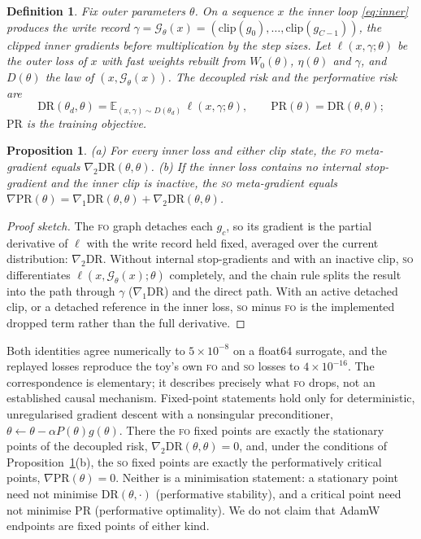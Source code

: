 \documentclass[11pt]{article}
\newtheorem{proposition}{Proposition}
\newtheorem{definition}{Definition}
\newcommand{\FO}{\textsc{fo}}
\newcommand{\SO}{\textsc{so}}
\begin{document}
\begin{definition}
Fix outer parameters $\theta$. On a sequence $x$ the inner loop \eqref{eq:inner} produces the
\emph{write record} $\gamma=\mathcal G_\theta(x)=(\mathrm{clip}(g_0),\dots,\mathrm{clip}(g_{C-1}))$,
the clipped inner gradients before multiplication by the step sizes. Let $\ell(x,\gamma;\theta)$ be
the outer loss of $x$ with fast weights rebuilt from $W_0(\theta)$, $\eta(\theta)$ and $\gamma$, and
$D(\theta)$ the law of $(x,\mathcal G_\theta(x))$. The \emph{decoupled risk} and the
\emph{performative risk} are
\begin{equation*}
  \mathrm{DR}(\theta_d,\theta)=\mathbb E_{(x,\gamma)\sim D(\theta_d)}\,\ell(x,\gamma;\theta),
  \qquad \mathrm{PR}(\theta)=\mathrm{DR}(\theta,\theta);
\end{equation*}
$\mathrm{PR}$ is the training objective.
\end{definition}

\begin{proposition}
\label{prop:decoupled}
(a) For every inner loss and either clip state, the \FO{} meta-gradient equals
$\nabla_2\mathrm{DR}(\theta,\theta)$. (b) If the inner loss contains no internal stop-gradient and the
inner clip is inactive, the \SO{} meta-gradient equals
$\nabla\mathrm{PR}(\theta)=\nabla_1\mathrm{DR}(\theta,\theta)+\nabla_2\mathrm{DR}(\theta,\theta)$.
\end{proposition}

\begin{proof}[Proof sketch]
The \FO{} graph detaches each $g_c$, so its gradient is the partial derivative of $\ell$ with the
write record held fixed, averaged over the current distribution: $\nabla_2\mathrm{DR}$. Without
internal stop-gradients and with an inactive clip, \SO{} differentiates
$\ell(x,\mathcal G_\theta(x);\theta)$ completely, and the chain rule splits the result into the path
through $\gamma$ ($\nabla_1\mathrm{DR}$) and the direct path. With an active detached clip, or a
detached reference in the inner loss, \SO{} minus \FO{} is the implemented dropped term rather than
the full derivative.
\end{proof}

Both identities agree numerically to $5\times10^{-8}$ on a float64 surrogate, and the replayed losses
reproduce the toy's own \FO{} and \SO{} losses to $4\times10^{-16}$. The correspondence is elementary;
it describes precisely what \FO{} drops, not an established causal mechanism. Fixed-point statements
hold only for deterministic, unregularised gradient descent with a nonsingular preconditioner,
$\theta\leftarrow\theta-\alpha P(\theta)g(\theta)$. There the \FO{} fixed points are exactly the
stationary points of the decoupled risk, $\nabla_2\mathrm{DR}(\theta,\theta)=0$, and, under the
conditions of Proposition~\ref{prop:decoupled}(b), the \SO{} fixed points are exactly the
performatively critical points, $\nabla\mathrm{PR}(\theta)=0$. Neither is a minimisation statement: a
stationary point need not minimise $\mathrm{DR}(\theta,\cdot)$ (performative stability), and a
critical point need not minimise $\mathrm{PR}$ (performative optimality). We do not claim that AdamW
endpoints are fixed points of either kind.
\end{document}
